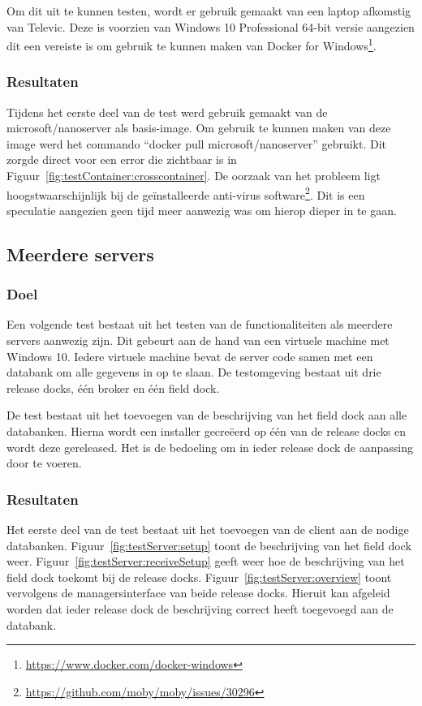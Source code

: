 Om dit uit te kunnen testen, wordt er gebruik gemaakt van een laptop afkomstig van Televic.
Deze is voorzien van Windows 10 Professional 64-bit versie aangezien dit een vereiste is om gebruik te kunnen maken van Docker for Windows\footnote{\url{https://www.docker.com/docker-windows}}.

\subsubsection{Resultaten}
Tijdens het eerste deel van de test werd gebruik gemaakt van de microsoft/nanoserver als basis-image.
Om gebruik te kunnen maken van deze image werd het commando ``docker pull microsoft/nanoserver'' gebruikt.
Dit zorgde direct voor een error die zichtbaar is in Figuur~\ref{fig:testContainer:crosscontainer}.
De oorzaak van het probleem ligt hoogstwaarschijnlijk bij de geïnstalleerde anti-virus software\footnote{\url{https://github.com/moby/moby/issues/30296}}.
Dit is een speculatie aangezien geen tijd meer aanwezig was om hierop dieper in te gaan.

\subsection{Meerdere servers}
\subsubsection{Doel}
Een volgende test bestaat uit het testen van de functionaliteiten als meerdere servers aanwezig zijn.
Dit gebeurt aan de hand van een virtuele machine met Windows 10.
Iedere virtuele machine bevat de server code samen met een databank om alle gegevens in op te slaan.
De testomgeving bestaat uit drie release docks, één broker en één field dock.

De test bestaat uit het toevoegen van de beschrijving van het field dock aan alle databanken.
Hierna wordt een installer gecreëerd op één van de release docks en wordt deze gereleased.
Het is de bedoeling om in ieder release dock de aanpassing door te voeren.

\subsubsection{Resultaten}
Het eerste deel van de test bestaat uit het toevoegen van de client aan de nodige databanken.
Figuur~\ref{fig:testServer:setup} toont de beschrijving van het field dock weer.
Figuur~\ref{fig:testServer:receiveSetup} geeft weer hoe de beschrijving van het field dock toekomt bij de release docks.
Figuur~\ref{fig:testServer:overview} toont vervolgens de managersinterface van beide release docks.
Hieruit kan afgeleid worden dat ieder release dock de beschrijving correct heeft toegevoegd aan de databank.

